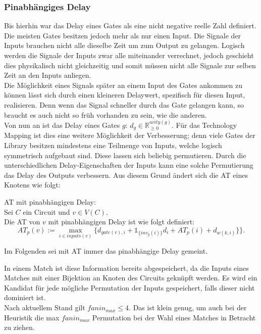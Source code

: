 \documentclass[11pt, a4paper, german]{article}
\newcommand{\TM}{Technology  Mapping }
\begin{document}
\subsubsection{Pinabhängiges Delay}
\label{subsec:pinabh_delay}
Bis hierhin war das Delay eines Gates als eine nicht negative reelle Zahl definiert. Die meisten Gates besitzen jedoch mehr als nur einen Input. Die Signale der Inputs brauchen nicht alle dieselbe Zeit um zum Output zu gelangen. Logisch werden die Signale der Inputs zwar alle miteinander verrechnet, jedoch geschieht dies physikalisch nicht gleichzeitig und somit müssen nicht alle Signale zur selben Zeit an den Inputs anliegen.\\
Die Möglichkeit eines Signals später an einem Input des Gates ankommen zu können lässt sich durch einen kleineren Delaywert, spezifisch für diesen Input, realisieren. Denn wenn das Signal schneller durch das Gate gelangen kann, so braucht es auch nicht so früh vorhanden zu sein, wie die anderen. \\
Von nun an ist das Delay eines Gates $g$: $d_g \in \mathbb{R}_{\geq 0}^{arity(g)}$. Für das \TM ist dies eine weitere Möglichkeit der Verbesserung; denn viele Gates der Library besitzen mindestens eine Teilmenge von Inputs, welche logisch symmetrisch aufgebaut sind. Diese lassen sich beliebig permutieren. Durch die unterschiedlichen Delay-Eigenschaften der Inputs kann eine solche Permutierung das Delay des Outputs verbessern. Aus diesem Grund ändert sich die AT eines Knotens wie folgt: 
\begin{definition}{AT mit pinabhängigen Delay:}\\
	Sei $C$ ein Circuit und $v \in V(C)$.\\
	Die AT von $v$ mit pinabhängigen Delay ist wie folgt definiert: \[ AT_p(v) :=  \max\limits_{i \in inputs(v)} \{   d_{gate(v),i} + \mathbb{1}_{\{inv_g(i) \}} d_{i} + AT_p(i) + d_{w(k,i)} \}   \}.\]
\end{definition}
Im Folgenden sei mit AT immer das pinabhängige Delay gemeint.

In einem Match ist diese Information bereits abgespeichert, da die Inputs eines Matches mit einer Bijektion an Knoten des Circuits geknüpft werden. Es wird ein  Kandidat für jede mögliche Permutation der Inputs gespeichert, falls dieser nicht dominiert ist.\\
Nach aktuellem Stand gilt $fanin_{max} \leq 4$. Das ist klein genug, um auch bei der Heuristik die max $fanin_{max}$ Permutation bei der Wahl eines Matches in Betracht zu ziehen. 
\end{document}
